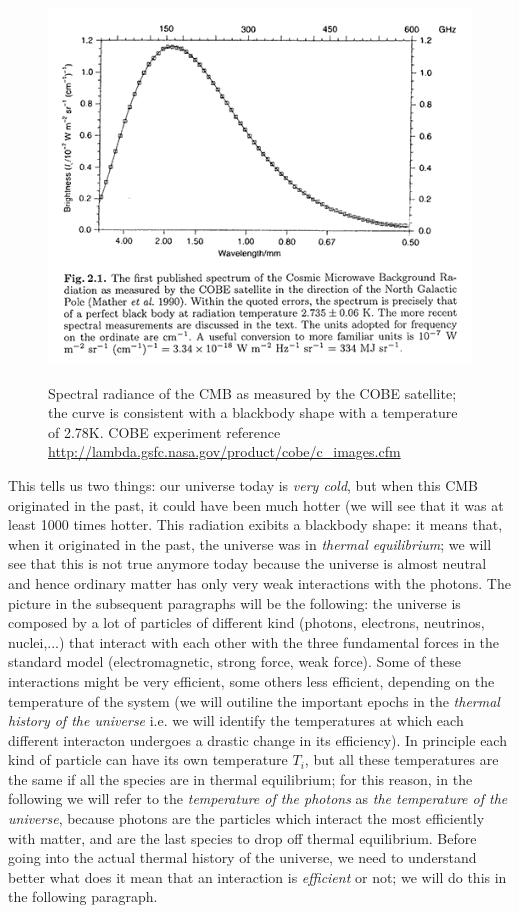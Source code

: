 \begin{figure}
\begin{center}
\includegraphics[scale=0.7]{Draw/cmbrad.png}
\label{}
\end{center}
\caption{Spectral radiance of the CMB as measured by the COBE satellite; the curve is consistent with a blackbody shape with a temperature of 2.78K. COBE experiment reference \url{http://lambda.gsfc.nasa.gov/product/cobe/c_images.cfm}}
\label{cmbspectral}
\end{figure}
This tells us two things: our universe today is \textit{very cold}, but when this CMB originated in the past, it could have been much hotter (we will see that it was at least 1000 times hotter. This radiation exibits a blackbody shape: it means that, when it originated in the past, the universe was in \textit{thermal equilibrium}; we will see that this is not true anymore today because the universe is almost neutral and hence ordinary matter has only very weak interactions with the photons. The picture in the subsequent paragraphs will be the following: the universe is composed by a lot of particles of different kind (photons, electrons, neutrinos, nuclei,...) that interact with each other with the three fundamental forces in the standard model (electromagnetic, strong force, weak force). Some of these interactions might be very efficient, some others less efficient, depending on the temperature of the system (we will outiline the important epochs in the \textit{thermal history of the universe} i.e. we will 
identify the temperatures at which each different interacton undergoes a drastic change in its efficiency). In principle each kind of particle can have its own temperature $T_i$, but all these temperatures are the same if all the species are in thermal equilibrium; for this reason, in the following we will refer to the \textit{temperature of the photons} as \textit{the temperature of the universe}, because photons are the particles which interact the most efficiently with matter, and are the last species to drop off thermal equilibrium. Before going into the actual thermal history of the universe, we need to understand better what does it mean that an interaction is \textit{efficient} or not; we will do this in the following paragraph. 

